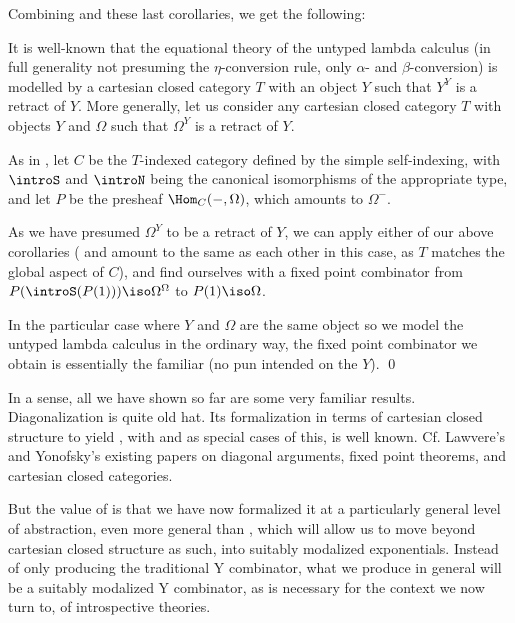 Combining  and these last corollaries, we get the following:

\label{YCombinator}
It is well-known that the equational theory of the untyped lambda calculus (in full generality not presuming the $\eta$-conversion rule, only $\alpha$- and $\beta$-conversion) is modelled by a cartesian closed category $T$ with an object $Y$ such that $Y^Y$ is a retract of $Y$. More generally, let us consider any cartesian closed category $T$ with objects $Y$ and $\Omega$ such that $\Omega^Y$ is a retract of $Y$.

As in , let $C$ be the $T$-indexed category defined by the simple self-indexing, with $\introS$ and $\introN$ being the canonical isomorphisms of the appropriate type, and let $P$ be the presheaf $\Hom_C(-, \Omega)$, which amounts to $\Omega^{-}$.

As we have presumed $\Omega^Y$ to be a retract of $Y$, we can apply either of our above corollaries ( and  amount to the same as each other in this case, as $T$ matches the global aspect of $C$), and find ourselves with a fixed point combinator from $P(\introS(P(1))) \iso \Omega^{\Omega}$ to $P(1) \iso \Omega$. 

In the particular case where $Y$ and $\Omega$ are the same object so we model the untyped lambda calculus in the ordinary way, the fixed point combinator we obtain is essentially the familiar  (no pun intended on the $Y$). \qed
{}

In a sense, all we have shown so far are some very familiar results. Diagonalization is quite old hat. Its formalization in terms of cartesian closed structure to yield , with  and  as special cases of this, is well known. Cf. Lawvere's and Yonofsky's existing papers on diagonal arguments, fixed point theorems, and cartesian closed categories. 

But the value of  is that we have now formalized it at a particularly general level of abstraction, even more general than , which will allow us to move beyond cartesian closed structure as such, into suitably modalized exponentials. Instead of only producing the traditional Y combinator, what we produce in general will be a suitably modalized Y combinator, as is necessary for the context we now turn to, of introspective theories.

